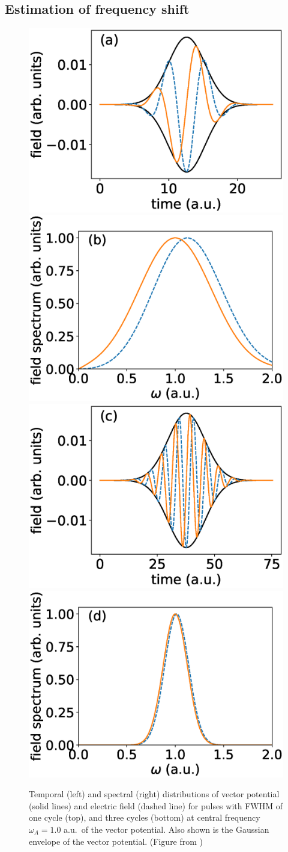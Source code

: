 \subsection{Estimation of frequency shift}
\label{sec:pulse}
\begin{figure}[!ht]
\centering
   
   \includegraphics[width=0.4\linewidth]{figs/Frequency_shift/01_field.eps}
   \includegraphics[width=0.4\linewidth]{figs/Frequency_shift/01_spec.eps}
   \includegraphics[width=0.4\linewidth]{figs/Frequency_shift/03_field.eps}
   \includegraphics[width=0.4\linewidth]{figs/Frequency_shift/03_spec.eps}
   
\caption{
Temporal (left) and spectral (right) distributions of vector potential (solid lines) and electric field (dashed line) for pulses with FWHM of one cycle (top), and three cycles (bottom) at central frequency $\omega_A = 1.0$ a.u.\  of the vector potential. Also shown is the Gaussian envelope of the vector potential. (Figure from \cite{venzke2018_Central})
} 
  \label{fig:spectra}
\end{figure}

